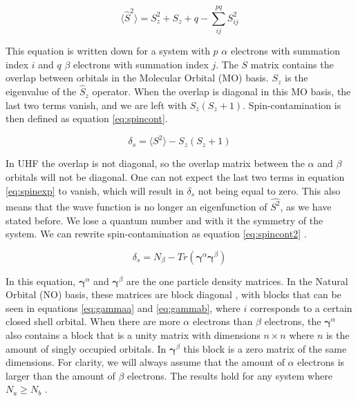 \begin{equation}\label{eq:spinexp}
  \langle \hat{S}^2 \rangle = S_z^2 + S_z + q - \sum_{ij}^{pq} S_{ij}^2
\end{equation}

This equation is written down for a system with $p$ $\alpha$ electrons with summation index $i$ and $q$ $\beta$ electrons with summation index $j$. The $S$ matrix contains the overlap
between orbitals in the Molecular Orbital (MO)
basis. $S_z$ is the eigenvalue of the $\hat{S}_z$ operator. When the overlap is diagonal in this MO basis, the last two terms vanish, and we are left with $S_z(S_z + 1)$.
Spin-contamination is then defined as equation \eqref{eq:spincont}.

\begin{equation}\label{eq:spincont}
  \delta_s = \langle S^2 \rangle - S_z(S_z + 1)
\end{equation}

In UHF the overlap is not diagonal, so the overlap matrix between the $\alpha$ and $\beta$ orbitals will not be diagonal. One can not
expect the last two terms in equation \eqref{eq:spinexp} to vanish, which will result in $\delta_s$ not being equal to zero. This also means that the wave function is no longer an
eigenfunction of $\hat{S^2}$, as we have stated before. We lose a quantum number and with it the symmetry of the system. We can rewrite spin-contamination as equation
\eqref{eq:spincont2} \cite{Savin2010}.

\begin{equation}\label{eq:spincont2}
  \delta_s = N_\beta - Tr(\mathbf{\gamma}^\alpha\mathbf{\gamma}^\beta)
\end{equation}

In this equation, $\mathbf{\gamma}^{\alpha}$ and $\mathbf{\gamma}^\beta$ are the one particle density matrices. In the Natural Orbital (NO) basis, these matrices are block diagonal
 \cite{Scuseria2010}, with blocks that can be seen in equations \eqref{eq:gammaa} and \eqref{eq:gammab}, where $i$ corresponds to a certain closed shell orbital. When there are more
$\alpha$ electrons than $\beta$ electrons,
the $\mathbf{\gamma}^\alpha$ also contains a block that is a unity matrix with dimensions $n\times n$ where $n$ is the amount of singly occupied orbitals. In $\mathbf{\gamma}^\beta$ this block is a
zero matrix of the same dimensions. For clarity, we will always assume that the amount of $\alpha$ electrons is larger than the amount of $\beta$ electrons. The results hold for any system
where $N_a \geq N_b $  \cite{Scuseria2010}.

